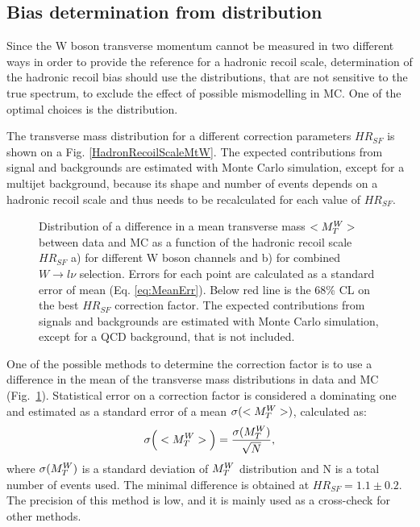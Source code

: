 \subsection{Bias determination from \mtw distribution}


Since the W boson transverse momentum cannot be measured in two different ways in order to provide the reference for a hadronic recoil scale, determination of the hadronic recoil bias should use the distributions, that  are not sensitive to the true \ptw spectrum, to exclude the effect of possible \ptw mismodelling in MC.  One of the optimal choices is the \mtw distribution. 

The transverse mass distribution for a different correction parameters $HR_{SF}$ is shown on a Fig. \ref{HadronRecoilScaleMtW}. The expected contributions from signal and backgrounds are estimated with Monte Carlo simulation, except for a multijet background, because its shape and number of events depends on a hadronic recoil scale and thus needs to be recalculated for each value of $HR_{SF}$. 

\begin{figure}[!tbp]
\begin{minipage}[h]{0.49\linewidth}
\end{minipage}
\hfill
\begin{minipage}[h]{0.49\linewidth}
\end{minipage}
\caption{Distribution of a difference in a mean transverse mass $<M_T^W>$ between data and MC as a function of the hadronic recoil scale $HR_{SF}$ a) for different W boson channels and b) for combined $W \to l \nu$ selection. Errors for each point are calculated as a standard error of mean (Eq. \ref{eq:MeanErr}). Below red line is the 68\% CL on the best $HR_{SF}$ correction factor. The expected contributions from signals and backgrounds are estimated with Monte Carlo simulation, except for a QCD background, that is not included.}
\label{fig:HRBiasMean}
\end{figure}

One of the possible methods to determine the correction factor is to use a difference in the mean of the transverse mass distributions in data and MC (Fig.~\ref{fig:HRBiasMean}). Statistical error on a correction factor is considered a dominating one and estimated as a standard error of a mean $\sigma ( <M_T^W> ) $, calculated as:
\begin{equation}\label{eq:MeanErr}
\sigma \Big( <M_T^W> \Big) = \frac{\sigma( M_T^W )}{\sqrt N},
\end{equation}
where $\sigma(M_T^W)$ is a standard deviation of $M_T^W$ distribution and N is a total number of events used. The minimal difference is obtained at $HR_{SF}=1.1\pm0.2$. The precision of this method is low, and it is mainly used as a cross-check for other methods. 

